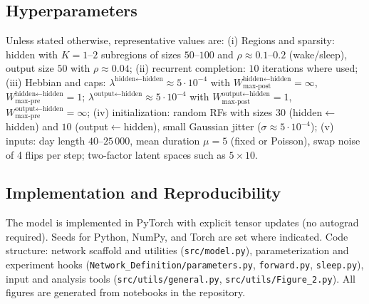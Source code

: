\documentclass{article}
\begin{document}
\subsection*{Hyperparameters}
Unless stated otherwise, representative values are: (i) Regions and sparsity: hidden with $K=1$–$2$ subregions of sizes $50$–$100$ and $\rho\approx0.1$–$0.2$ (wake/sleep), output size $50$ with $\rho\approx0.04$; (ii) recurrent completion: $10$ iterations where used; (iii) Hebbian and caps: $\lambda^{\text{hidden}\leftarrow\text{hidden}}\approx5\cdot10^{-4}$ with $W^{\text{hidden}\leftarrow\text{hidden}}_{\text{max-post}}=\infty$, $W^{\text{hidden}\leftarrow\text{hidden}}_{\text{max-pre}}=1$; $\lambda^{\text{output}\leftarrow\text{hidden}}\approx5\cdot10^{-4}$ with $W^{\text{output}\leftarrow\text{hidden}}_{\text{max-post}}=1$, $W^{\text{output}\leftarrow\text{hidden}}_{\text{max-pre}}=\infty$; (iv) initialization: random RFs with sizes $30$ (hidden$\leftarrow$hidden) and $10$ (output$\leftarrow$hidden), small Gaussian jitter ($\sigma\approx5\cdot10^{-4}$); (v) inputs: day length $40$–$25\,000$, mean duration $\mu=5$ (fixed or Poisson), swap noise of 4 flips per step; two-factor latent spaces such as $5\times10$.

\subsection*{Implementation and Reproducibility}
The model is implemented in PyTorch with explicit tensor updates (no autograd required). Seeds for Python, NumPy, and Torch are set where indicated. Code structure: network scaffold and utilities (\texttt{src/model.py}), parameterization and experiment hooks (\texttt{Network\_Definition/parameters.py}, \texttt{forward.py}, \texttt{sleep.py}), input and analysis tools (\texttt{src/utils/general.py}, \texttt{src/utils/Figure\_2.py}). All figures are generated from notebooks in the repository.
\end{document}
